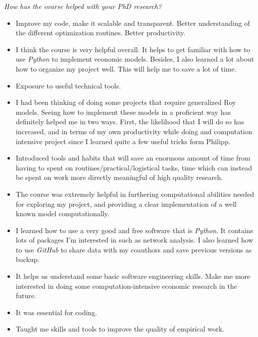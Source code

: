 \begin{boenumerate}
\begin{itemize}
\end{itemize}
\item \textit{How has the course helped with your PhD research?}
\begin{itemize}
\item Improve my code, make it scalable and transparent. Better understanding of the different optimization routines. Better productivity.
\item I think the course is very helpful overall. It helps to get familiar with how to use \textit{Python} to implement economic models. Besides, I also learned a lot about how to organize my project well. This will help me to save a lot of time.
\item Exposure to useful technical tools.
\item I had been thinking of doing some projects that require generalized Roy models. Seeing how to implement these models in a proficient way has definitely helped me in two ways. First, the likelihood that I will do so has increased, and in terms of my own productivity while doing and computation intensive project since I learned quite a few useful tricks form Philipp.
\item Introduced tools and habits that will save an enormous amount of time from having to spent on routines/practical/logistical tasks, time which can instead be spent on work more directly meaningful of high quality research.
\item The course was extremely helpful in furthering computational abilities needed for exploring my project, and providing a clear implementation of a well known model computationally.
\item I learned how to use a very good and free software that is \textit{Python}. It contains lots of packages I'm interested in such as network analysis. I also learned how to use \textit{GitHub} to share data with my coauthors and save previous versions as backup.
\item It helps us understand some basic software engineering skills. Make me more interested in doing some computation-intensive economic research in the future.
\item It was essential for coding.
\item Taught me skills and tools to improve the quality of empirical work.
\end{itemize}

\end{boenumerate}
